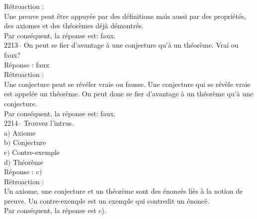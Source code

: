 \documentclass[letterpaper, 12pt]{article}
\begin{document}
R\'etroaction :\\
Une preuve peut \^etre appuy\'ee par des d\'efinitions mais aussi par des propri\'et\'es, des axiomes et des th\'eor\`emes d\'ej\`a d\'emontr\'es.\\
Par cons\'equent, la r\'eponse est: faux.\\

2213-- On peut se fier d'avantage \`a une conjecture qu'\`a un th\'eor\`eme. Vrai ou faux?\\

R\'eponse : faux\\

R\'etroaction :\\
Une conjecture peut se r\'ev\'eler vraie ou fausse. Une conjecture qui se r\'ev\`ele vraie est appel\'ee un th\'eor\`eme. On peut donc se fier d'avantage \`a un th\'eor\`eme qu'\`a une conjecture.\\
Par cons\'equent, la r\'eponse est: faux.\\


2214-- Trouvez l'intrus.\\

a$)$ Axiome\\
b$)$ Conjecture\\
c$)$ Contre-exemple\\
d$)$ Th\'eor\`eme\\

R\'eponse : c$)$\\

R\'etroaction :\\
Un axiome, une conjecture et un th\'eor\`eme sont des \'enonc\'es li\'es \`a la notion de preuve. Un contre-exemple est un exemple qui contredit un \'enonc\'e.\\
Par cons\'equent, la r\'eponse est c).\\
\end{document}
